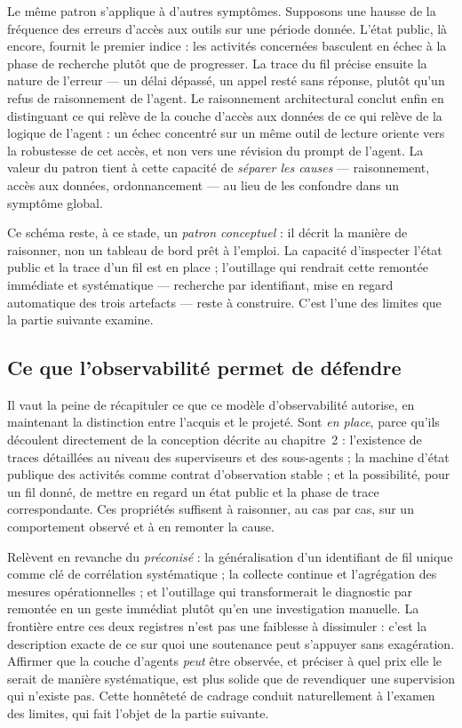 Le même patron s'applique à d'autres symptômes. Supposons une hausse
de la fréquence des erreurs d'accès aux outils sur une période donnée.
L'état public, là encore, fournit le premier indice : les activités
concernées basculent en échec à la phase de recherche plutôt que de
progresser. La trace du fil précise ensuite la nature de l'erreur — un
délai dépassé, un appel resté sans réponse, plutôt qu'un refus de
raisonnement de l'agent. Le raisonnement architectural conclut enfin
en distinguant ce qui relève de la couche d'accès aux données de ce qui
relève de la logique de l'agent : un échec concentré sur un même outil
de lecture oriente vers la robustesse de cet accès, et non vers une
révision du prompt de l'agent. La valeur du patron tient à cette
capacité de \emph{séparer les causes} — raisonnement, accès aux
données, ordonnancement — au lieu de les confondre dans un symptôme
global.

Ce schéma reste, à ce stade, un \emph{patron conceptuel} : il décrit
la manière de raisonner, non un tableau de bord prêt à l'emploi. La
capacité d'inspecter l'état public et la trace d'un fil est en place ;
l'outillage qui rendrait cette remontée immédiate et systématique —
recherche par identifiant, mise en regard automatique des trois
artefacts — reste à construire. C'est l'une des limites que la partie
suivante examine.

\subsection{Ce que l'observabilité permet de défendre}
\label{sec:synthese-observabilite}

Il vaut la peine de récapituler ce que ce modèle d'observabilité
autorise, en maintenant la distinction entre l'acquis et le projeté.
Sont \emph{en place}, parce qu'ils découlent directement de la
conception décrite au chapitre~2 : l'existence de traces détaillées au
niveau des superviseurs et des sous-agents ; la machine d'état publique
des activités comme contrat d'observation stable ; et la possibilité,
pour un fil donné, de mettre en regard un état public et la phase de
trace correspondante. Ces propriétés suffisent à raisonner, au cas par
cas, sur un comportement observé et à en remonter la cause.

Relèvent en revanche du \emph{préconisé} : la généralisation d'un
identifiant de fil unique comme clé de corrélation systématique ; la
collecte continue et l'agrégation des mesures opérationnelles ; et
l'outillage qui transformerait le diagnostic par remontée en un geste
immédiat plutôt qu'en une investigation manuelle. La frontière entre
ces deux registres n'est pas une faiblesse à dissimuler : c'est la
description exacte de ce sur quoi une soutenance peut s'appuyer sans
exagération. Affirmer que la couche d'agents \emph{peut} être observée,
et préciser à quel prix elle le serait de manière systématique, est
plus solide que de revendiquer une supervision qui n'existe pas. Cette
honnêteté de cadrage conduit naturellement à l'examen des limites, qui
fait l'objet de la partie suivante.

